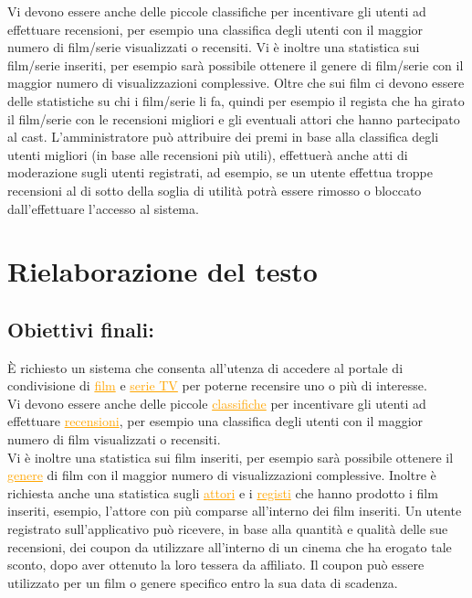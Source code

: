\documentclass[a4paper,12pt]{report}
\begin{document}
	Vi devono essere anche delle piccole classifiche per incentivare gli utenti ad effettuare recensioni, per esempio una classifica degli utenti con il maggior numero di film/serie visualizzati o recensiti. Vi è inoltre una statistica sui film/serie inseriti, per esempio sarà possibile ottenere il genere di film/serie con il maggior numero di visualizzazioni complessive. Oltre che sui film ci devono essere delle statistiche su chi i film/serie li fa, quindi per esempio il regista che ha girato il film/serie con le recensioni migliori e gli eventuali attori che hanno partecipato al cast. L'amministratore può attribuire dei premi in base alla classifica degli utenti migliori (in base alle recensioni più utili), effettuerà anche atti di moderazione sugli utenti registrati, ad esempio, se un utente effettua troppe recensioni al di sotto della soglia di utilità potrà essere rimosso o bloccato dall'effettuare l'accesso al sistema.
	\section{Rielaborazione del testo}
	\subsection{Obiettivi finali:}
	È richiesto un sistema che consenta all'utenza di accedere al portale di condivisione di \textcolor{orange}{\underline{film}} e \textcolor{orange}{\underline{serie TV}} per poterne recensire uno o più di interesse.\\
	Vi devono essere anche delle piccole \textcolor{orange}{\underline{classifiche}} per incentivare gli utenti ad effettuare \textcolor{orange}{\underline{recensioni}}, per esempio una classifica degli utenti con il maggior numero di film visualizzati o recensiti.\\ 
	Vi è inoltre una statistica sui film inseriti, per esempio sarà possibile ottenere il \textcolor{orange}{\underline{genere}} di film con il maggior numero di visualizzazioni complessive. Inoltre è richiesta anche una statistica sugli \textcolor{orange}{\underline{attori}} e i \textcolor{orange}{\underline{registi}} che hanno prodotto i film inseriti, esempio, l'attore con più comparse all'interno dei film inseriti.
	Un utente registrato sull'applicativo può ricevere, in base alla quantità e qualità delle sue recensioni, dei coupon da utilizzare all'interno di un cinema che ha erogato tale sconto, dopo aver ottenuto la loro tessera da affiliato. Il coupon può essere utilizzato per un film o genere specifico entro la sua data di scadenza.
\end{document}
